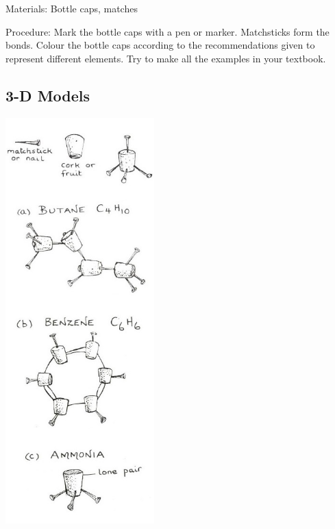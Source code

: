 \begin{multicols}{2}
\begin{description*}
\item[Materials:]{Bottle caps, matches}
\item[Procedure:]{Mark the bottle caps with a pen or marker. Matchsticks form the bonds. Colour the bottle caps according to the recommendations given to represent different elements. Try to make all the examples in your textbook.}
\end{description*}

\vfill
\columnbreak

\subsection{3-D Models}

\begin{center} %
\includegraphics[width=0.43\textwidth]{./img/source/3d-models-2.jpg}
\end{center}


\end{multicols}
